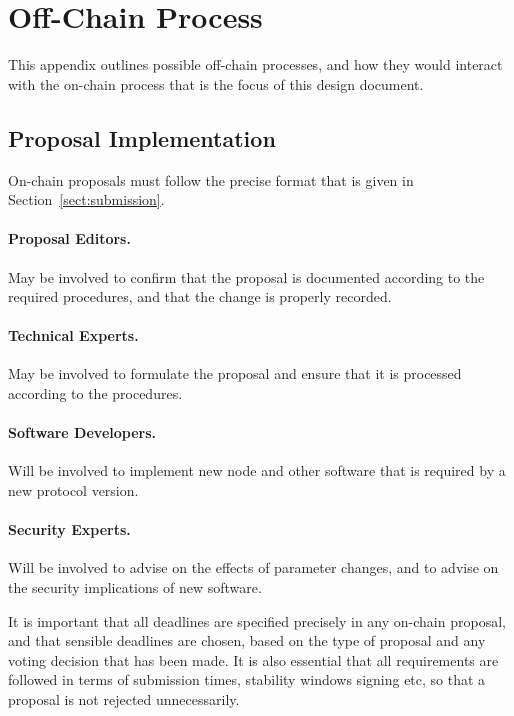 \section{Off-Chain Process}
\label{sect:off-chain}

This appendix outlines possible off-chain processes, and how they would interact with the on-chain process that is the focus of this design document.

\subsection{Proposal Implementation}

On-chain proposals must follow the precise format that is given in Section~\ref{sect:submission}.

\paragraph{Proposal Editors.}  May be involved to confirm that the proposal is documented according to the required procedures, and that the change is properly recorded.

\paragraph{Technical Experts.}  May be involved to formulate the proposal and ensure that it is processed according to the procedures.

\paragraph{Software Developers.} Will be involved to implement new node and other software that is required by a new protocol version.

\paragraph{Security Experts.} Will be involved to advise on the effects of parameter changes, and to advise on the security implications of new software.

It is important that all deadlines are specified precisely in any on-chain proposal, and that sensible deadlines are chosen, based on the type of proposal and any
voting decision that has been made.  It is also essential that all requirements are followed in terms of submission times, stability windows signing etc, so that a proposal is not
rejected unnecessarily.


